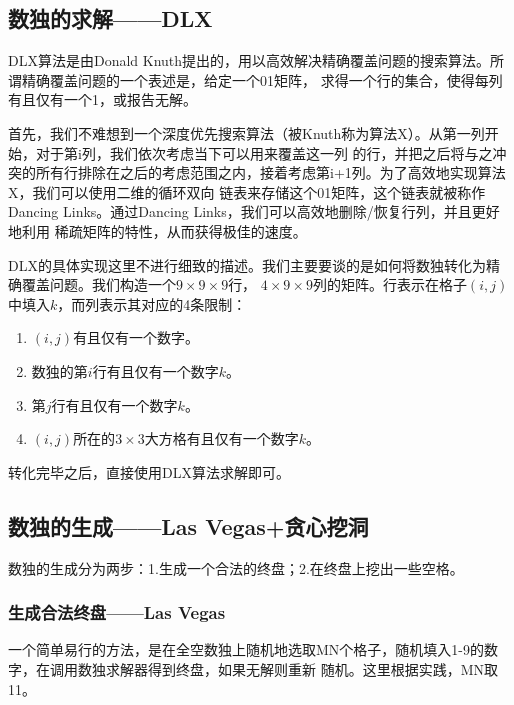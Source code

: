 \documentclass[a4paper,10pt]{article}
\begin{document}
        \subsection{数独的求解——DLX}

        DLX算法是由Donald Knuth提出的，用以高效解决精确覆盖问题的搜索算法。所谓精确覆盖问题的一个表述是，给定一个01矩阵，
        求得一个行的集合，使得每列有且仅有一个1，或报告无解。

        首先，我们不难想到一个深度优先搜索算法（被Knuth称为算法X）。从第一列开始，对于第i列，我们依次考虑当下可以用来覆盖这一列
        的行，并把之后将与之冲突的所有行排除在之后的考虑范围之内，接着考虑第i+1列。为了高效地实现算法X，我们可以使用二维的循环双向
        链表来存储这个01矩阵，这个链表就被称作Dancing Links。通过Dancing Links，我们可以高效地删除/恢复行列，并且更好地利用
        稀疏矩阵的特性，从而获得极佳的速度。

        DLX的具体实现这里不进行细致的描述。我们主要要谈的是如何将数独转化为精确覆盖问题。我们构造一个$9 \times 9 \times 9$行，
        $4 \times 9 \times 9$列的矩阵。行表示在格子$(i,j)$中填入$k$，而列表示其对应的4条限制：
        \begin{enumerate}
            \item $(i,j)$有且仅有一个数字。
            \item 数独的第$i$行有且仅有一个数字$k$。
            \item 第$j$行有且仅有一个数字$k$。
            \item $(i,j)$所在的$3 \times 3$大方格有且仅有一个数字$k$。
        \end{enumerate}

        转化完毕之后，直接使用DLX算法求解即可。

        \subsection{数独的生成——Las Vegas+贪心挖洞}

        数独的生成分为两步：1.生成一个合法的终盘；2.在终盘上挖出一些空格。

        \subsubsection{生成合法终盘——Las Vegas}

        一个简单易行的方法，是在全空数独上随机地选取MN个格子，随机填入1-9的数字，在调用数独求解器得到终盘，如果无解则重新
        随机。这里根据实践，MN取11。
\end{document}
